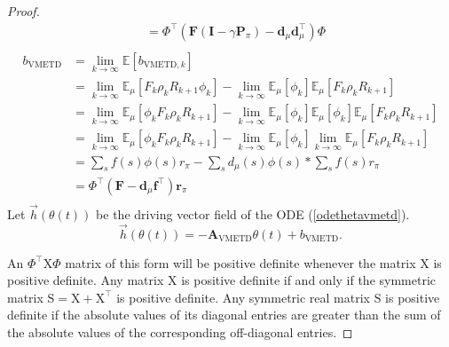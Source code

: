 \begin{proof}
\begin{equation}
\begin{split}
&={{\Phi}}^{\top} (\textbf{F} (\textbf{I} - \gamma \textbf{P}_{\pi})-\textbf{d}_{\mu} \textbf{d}_{\mu}^{\top} ){{\Phi}} \\
    \end{split}
\end{equation}
\begin{equation}
    \begin{split}
 {b}_{\text{VMETD}}&=\lim_{k \rightarrow \infty} \mathbb{E}[{b}_{\text{VMETD},k}]\\
&= \lim_{k \rightarrow \infty} \mathbb{E}_{\mu}[F_k\rho_kR_{k+1}{\phi}_k]- \lim_{k\rightarrow \infty} \mathbb{E}_{\mu}[{\phi}_k]\mathbb{E}_{\mu}[F_k\rho_kR_{k+1}]\\  
&= \lim_{k \rightarrow \infty} \mathbb{E}_{\mu}[{\phi}_kF_k\rho_kR_{k+1}]- \lim_{k\rightarrow \infty} \mathbb{E}_{\mu}[  {\phi}_k]\mathbb{E}_{\mu}[{\phi}_k]\mathbb{E}_{\mu}[F_k\rho_kR_{k+1}]\\ 
&= \lim_{k \rightarrow \infty} \mathbb{E}_{\mu}[{\phi}_kF_k\rho_kR_{k+1}]- \lim_{k \rightarrow \infty} \mathbb{E}_{\mu}[ {\phi}_k]\lim_{k \rightarrow \infty}\mathbb{E}_{\mu}[F_k\rho_kR_{k+1}]\\  
&=\sum_{s} f(s) {\phi}(s)r_{\pi} - \sum_{s} d_{\mu}(s) {\phi}(s) * \sum_{s} f(s)r_{\pi}  \\
&={{\Phi}}^{\top}(\textbf{F}-\textbf{d}_{\mu} \textbf{f}^{\top})\textbf{r}_{\pi} \\
    \end{split}
\end{equation}
 Let $\vec{h}({\theta}(t))$ be the driving vector field of the ODE
 (\ref{odethetavmetd}).
\begin{equation*}
 \vec{h}({\theta}(t))=-\textbf{A}_{\text{VMETD}}{\theta}(t)+{b}_{\text{VMETD}}.
\end{equation*}

 An ${\Phi}^{\top}{\text{X}}{\Phi}$ matrix of this
 form will be positive definite whenever the matrix ${\text{X}}$ is positive definite.
 Any matrix ${\text{X}}$ is positive definite if and only if
 the symmetric matrix ${\text{S}}={\text{X}}+{\text{X}}^{\top}$ is positive definite. 
 Any symmetric real matrix ${\text{S}}$ is positive definite if the absolute values of
 its diagonal entries are greater than the sum of the absolute values of the corresponding
 off-diagonal entries\cite{sutton2016emphatic}. 


\end{proof}
